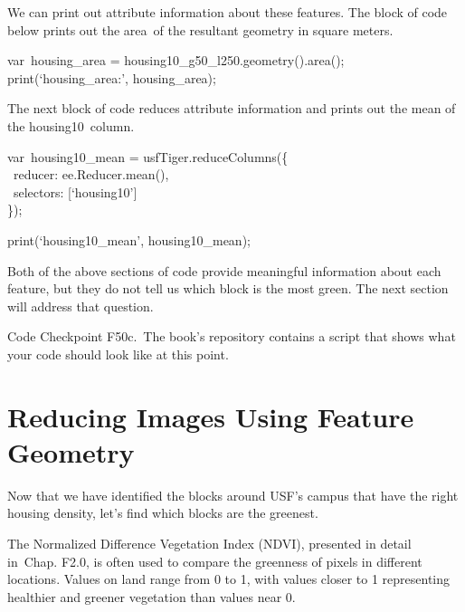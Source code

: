 \documentclass[
  letterpaper,
  DIV=11,
  numbers=noendperiod]{scrreprt}
\begin{document}
We can print out attribute information about these features. The block
of code below prints out the area~of the resultant geometry in square
meters.

var~housing\_area = housing10\_g50\_l250.geometry().area();\\
print(`housing\_area:', housing\_area);

The next block of code reduces attribute information and prints out the
mean of the housing10~column.

var~housing10\_mean = usfTiger.reduceColumns(\{\\
\hspace*{0.333em} ~reducer: ee.Reducer.mean(),\\
\hspace*{0.333em} ~selectors: {[}`housing10'{]}\\
\});

print(`housing10\_mean', housing10\_mean);

Both of the above sections of code provide meaningful information about
each feature, but they do not tell us which block is the most green. The
next section will address that question.

\begin{tcolorbox}[enhanced jigsaw, left=2mm, breakable, rightrule=.15mm, opacityback=0, colframe=quarto-callout-note-color-frame, colbacktitle=quarto-callout-note-color!10!white, arc=.35mm, opacitybacktitle=0.6, toptitle=1mm, colback=white, leftrule=.75mm, title=\textcolor{quarto-callout-note-color}{\faInfo}\hspace{0.5em}{Note}, toprule=.15mm, bottomtitle=1mm, titlerule=0mm, bottomrule=.15mm, coltitle=black]

Code Checkpoint F50c.~The book's repository contains a script that shows
what your code should look like at this point.~

\end{tcolorbox}

\hypertarget{reducing-images-using-feature-geometry}{%
\section{Reducing Images Using Feature
Geometry}\label{reducing-images-using-feature-geometry}}

Now that we have identified the blocks around USF's campus that have the
right housing density, let's find which blocks are the greenest.

The Normalized Difference Vegetation Index (NDVI), presented in detail
in~Chap. F2.0, is often used to compare the greenness of pixels in
different locations. Values on land range from 0 to 1, with values
closer to 1 representing healthier and greener vegetation than values
near 0.
\end{document}

